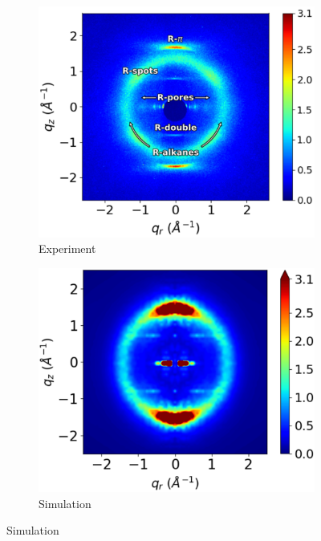 \documentclass{article}
\begin{document}
  \begin{figure}[!htb]
  	\centering
    \begin{subfigure}{0.49\linewidth}
    	\includegraphics[width=\linewidth]{WAXS_annotated_words.pdf}
        \caption{Experiment}\label{fig:WAXS}
    \end{subfigure}
	\begin{subfigure}{0.49\linewidth}
        \includegraphics[width=\linewidth]{solvated_offset_rzplot_1.pdf}
        \caption{Simulation}\label{fig:solvated_XRD}   

\end{subfigure}
\end{figure}
\end{document}
